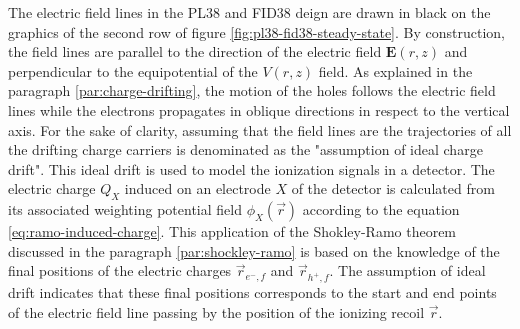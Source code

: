 
The electric field lines in the PL38 and FID38 deign are drawn in black on the graphics of the second row of figure \ref{fig:pl38-fid38-steady-state}. By construction, the field lines are parallel to the direction of the electric field $\bm{E}(r,z)$ and perpendicular to the equipotential of the $V(r,z)$ field. 
As explained in the paragraph \ref{par:charge-drifting}, the motion of the holes follows the electric field lines while the electrons propagates in oblique directions in respect to the vertical axis. For the sake of clarity, assuming that the field lines are the trajectories of all the drifting charge carriers is denominated as the "assumption of ideal charge drift".
This ideal drift is used to model the ionization signals in a detector. The electric charge $Q_X$ induced on an electrode $X$ of the detector is calculated from its associated weighting potential field $\phi_X(\vec{r})$ according to the equation \ref{eq:ramo-induced-charge}. This application of the Shokley-Ramo theorem discussed in the paragraph \ref{par:shockley-ramo} is based on the knowledge of the final positions of the electric charges $\vec{r}_{e^-,f}$ and $\vec{r}_{h^+,f}$. The assumption of ideal drift indicates that these final positions corresponds to the start and end points of the electric field line passing by the position of the ionizing recoil $\vec{r}$.

